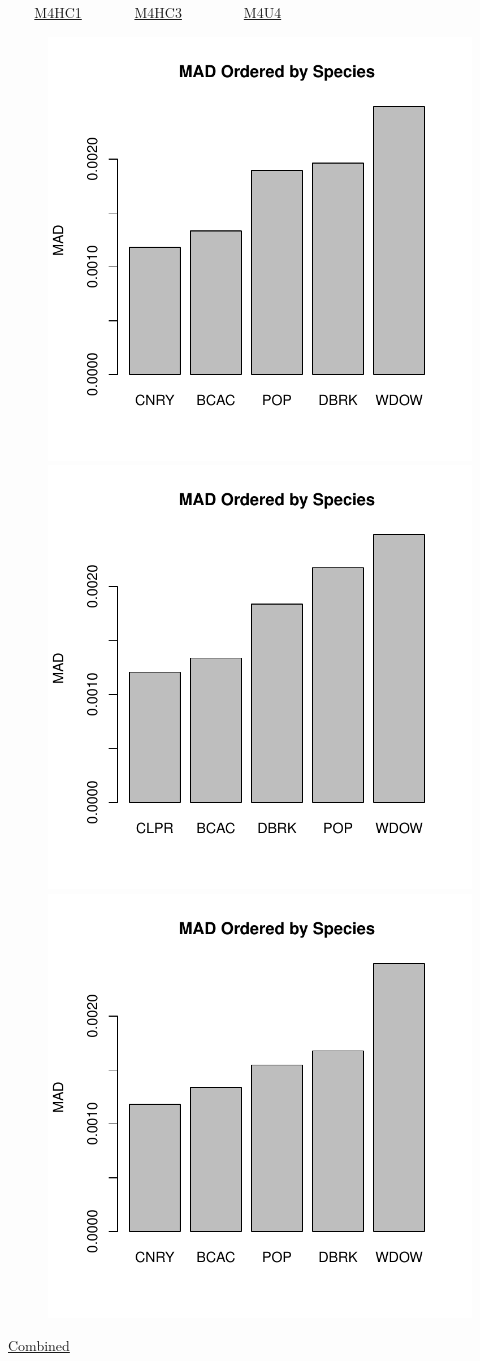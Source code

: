 \documentclass[ xcolor = pdftex, dvipsnames, table ]{beamer}
\begin{document}
\begin{frame}{$~~~~~~~$ \href{https://github.com/gasduster99/sppComp/tree/master/sscRuns/26919781982M4HC1}{M4HC1} $~~~~~~~~~~~~~~$ \href{https://github.com/gasduster99/sppComp/tree/master/sscRuns/26919781982M4HC3}{M4HC3} $~~~~~~~~~~~~~~~~~$ \href{https://github.com/gasduster99/sppComp/tree/master/sscRuns/26919781982M4U4}{M4U4} }
        \begin{figure}[ht!]
        \centering
        \hspace*{-1cm}
        \includegraphics[width=.4\textwidth]{../sscRuns/26919781982M4HC1/sppTailMad68.pdf}
        \includegraphics[width=.4\textwidth]{../sscRuns/26919781982M4HC3/sppTailMad68.pdf}
        \includegraphics[width=.4\textwidth]{../sscRuns/26919781982M4U4/sppTailMad68.pdf}
        \end{figure}
	\vspace{-1cm}
	\begin{center}
	\Large
	\href{https://github.com/gasduster99/sppComp/tree/master/try1/postSSC/26919781982M4HC1HC3U4}{Combined}
	\end{center}
\end{frame}
\end{document}
